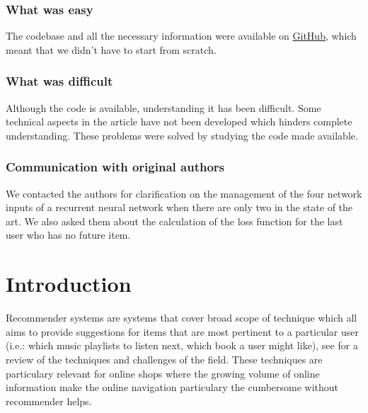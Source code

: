 \subsubsection{What was easy}

The codebase and all the necessary information were available on \href{https://github.com/srijankr/jodie}{GitHub}, which meant that we didn't have to start from scratch.

\subsubsection{What was difficult}

Although the code is available, understanding it has been difficult. Some technical aspects in the article have not been developed which hinders complete understanding. These problems were solved by studying the code made available.

\subsubsection{Communication with original authors}

We contacted the authors for clarification on the management of the four network inputs of a recurrent neural network when there are only two in the state of the art. We also asked them about the calculation of the loss function for the last user who has no future item.

\newpage

\section*{Introduction}

Recommender systems are systems that cover broad scope of technique which all aims to provide suggestions for items that are most pertinent to a particular user (i.e.: which music playlists to listen next, which book a user might like), see \cite{Ricci_Rokach_Shapira_2021} for a review of the techniques and challenges of the field. These techniques are particulary relevant for online shops where the growing volume of online information make the online navigation particulary the cumbersome without recommender helps. 

